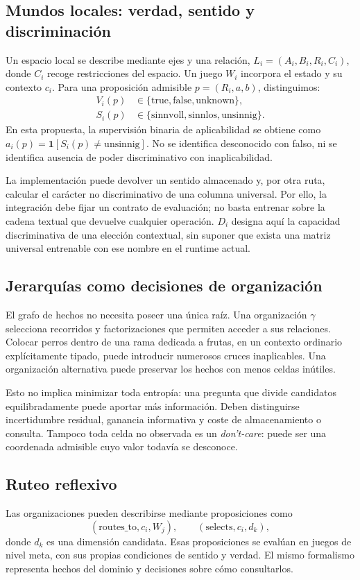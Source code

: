 \documentclass[11pt,a4paper]{article}
\newcommand{\ind}{\mathbf{1}}
\begin{document}
\subsection{Mundos locales: verdad, sentido y discriminación}
Un espacio local se describe mediante ejes y una relación,
$L_i=(A_i,B_i,R_i,C_i)$, donde $C_i$ recoge restricciones del espacio. Un juego
$W_i$ incorpora el estado y su contexto $c_i$. Para una proposición admisible
$p=(R_i,a,b)$, distinguimos:
\begin{align}
 V_i(p)&\in\{\mathrm{true},\mathrm{false},\mathrm{unknown}\},\\
 S_i(p)&\in\{\mathrm{sinnvoll},\mathrm{sinnlos},\mathrm{unsinnig}\}.
\end{align}
En esta propuesta, la supervisión binaria de aplicabilidad se obtiene como
$a_i(p)=\ind[S_i(p)\neq\mathrm{unsinnig}]$. No se identifica desconocido con
falso, ni se identifica ausencia de poder discriminativo con inaplicabilidad.

La implementación puede devolver un sentido almacenado y, por otra ruta,
calcular el carácter no discriminativo de una columna universal. Por ello,
la integración debe fijar un contrato de evaluación; no basta entrenar sobre
la cadena textual que devuelve cualquier operación. $D_i$ designa aquí la
capacidad discriminativa de una elección contextual, sin suponer que exista
una matriz universal entrenable con ese nombre en el runtime actual.

\subsection{Jerarquías como decisiones de organización}
El grafo de hechos no necesita poseer una única raíz. Una organización $\gamma$
selecciona recorridos y factorizaciones que permiten acceder a sus relaciones.
Colocar perros dentro de una rama dedicada a frutas, en un contexto ordinario
explícitamente tipado, puede introducir numerosos cruces inaplicables. Una
organización alternativa puede preservar los hechos con menos celdas inútiles.

Esto no implica minimizar toda entropía: una pregunta que divide candidatos
equilibradamente puede aportar más información. Deben distinguirse incertidumbre
residual, ganancia informativa y coste de almacenamiento o consulta. Tampoco
toda celda no observada es un \emph{don't-care}: puede ser una coordenada
admisible cuyo valor todavía se desconoce.

\subsection{Ruteo reflexivo}
Las organizaciones pueden describirse mediante proposiciones como
\begin{equation}
 (\mathrm{routes\_to},c_i,W_j),\qquad
 (\mathrm{selects},c_i,d_k),
\end{equation}
donde $d_k$ es una dimensión candidata. Esas proposiciones se evalúan en juegos
de nivel meta, con sus propias condiciones de sentido y verdad. El mismo
formalismo representa hechos del dominio y decisiones sobre cómo consultarlos.
\end{document}
